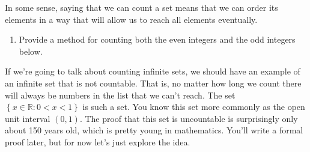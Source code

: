 \documentclass[12 pt]{article}
\newcommand{\R}{\mathbb{R}}
\newcommand{\set}[1]{\left\{#1\right\}}
\theoremstyle{definition}
\theoremstyle{plain}
\theoremstyle{mytheorem}
\theoremstyle{myexample}
\theoremstyle{mydefinition}
\begin{document}
In some sense, saying that we can count a set means that we can order its elements in a way that will allow us to reach all elements eventually.

\begin{enumerate}[resume]
\item Provide a method for counting both the even integers and the odd integers below.

\vspace{4in}
\end{enumerate}

If we're going to talk about counting infinite sets, we should have an example of an infinite set that is not countable.  That is, no matter how long we count there will always be numbers in the list that we can't reach.  The set $\set{x \in \R: 0 < x < 1}$ is such a set.  You know this set more commonly as the open unit interval $(0,1)$.  The proof that this set is uncountable is surprisingly only about 150 years old, which is pretty young in mathematics.  You'll write a formal proof later, but for now let's just explore the idea.\\
\end{document}
